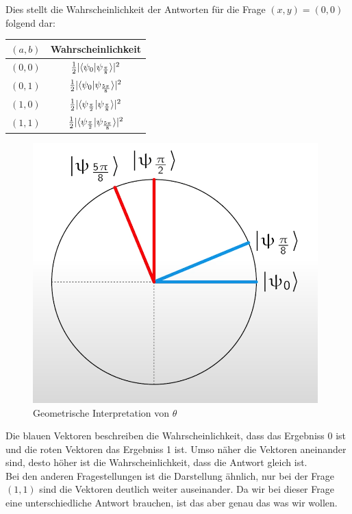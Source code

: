Dies stellt die Wahrscheinlichkeit der Antworten für die Frage $(x, y) = (0, 0)$ folgend dar:\\

\begin{center}
    \begin{tabular}{c|c}
    $(a, b)$ & Wahrscheinlichkeit \\ \hline
    $(0, 0)$ & $\frac{1}{2}\lvert \braket{\psi_0 | \psi_\frac{\pi}{8}} \rvert^2$  \\
    $(0, 1)$ & $\frac{1}{2}\lvert \braket{\psi_0 | \psi_\frac{5\pi}{8}} \rvert^2$  \\
    $(1, 0)$ & $\frac{1}{2}\lvert \braket{\psi_\frac{\pi}{2} | \psi_\frac{\pi}{8}} \rvert^2$  \\
    $(1, 1)$ & $\frac{1}{2}\lvert \braket{\psi_\frac{\pi}{2} | \psi_\frac{5\pi}{8}} \rvert^2$
    \end{tabular}
\end{center}

\begin{figure}[H]
    \centering
    \includegraphics[width=0.6\linewidth]{img/CHSH-geometric.png}
    \caption{Geometrische Interpretation von $\theta$ \protect\cite[1h3m]{IBM_chsh_2025}}
    \label{fig:CHSHGeometric}
\end{figure}

Die blauen Vektoren beschreiben die Wahrscheinlichkeit, dass das Ergebniss 0 ist und die roten Vektoren das Ergebniss 1 ist.
Umso näher die Vektoren aneinander sind, desto höher ist die Wahrscheinlichkeit, dass die Antwort gleich ist.\\

Bei den anderen Fragestellungen ist die Darstellung ähnlich, nur bei der Frage $(1, 1)$ sind die Vektoren deutlich weiter auseinander.
Da wir bei dieser Frage eine unterschiedliche Antwort brauchen, ist das aber genau das was wir wollen.\\

